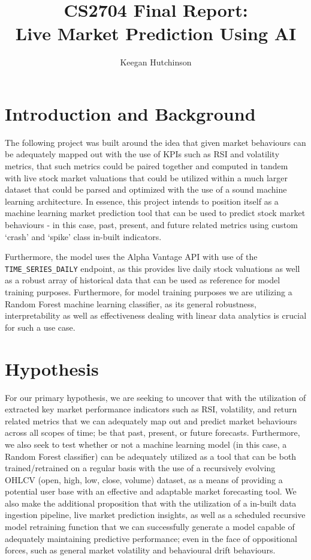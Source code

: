 \documentclass[runningheads]{llncs}
\title{CS2704 Final Report:\\Live Market Prediction Using AI}
\author{Keegan Hutchinson}
\institute{Faculty of Computer Science\\
University of New Brunswick Saint John\\
\email{khutchi3@unb.ca}\\
(Solo Submission)}
\begin{document}
\maketitle


\section{Introduction and Background}
The following project was built around the idea that given market behaviours can be adequately mapped out with the use of KPIs such as RSI and volatility metrics, that such metrics could be paired together and computed in tandem with live stock market valuations that could be utilized within a much larger dataset that could be parsed and optimized with the use of a sound machine learning architecture. In essence, this project intends to position itself as a machine learning market prediction tool that can be used to predict stock market behaviours - in this case, past, present, and future related metrics using custom ‘crash’ and ‘spike’ class in-built indicators.

Furthermore, the model uses the Alpha Vantage API with use of the \texttt{TIME\_SERIES\_DAILY} endpoint, as this provides live daily stock valuations as well as a robust array of historical data that can be used as reference for model training purposes. Furthermore, for model training purposes we are utilizing a Random Forest machine learning classifier, as its general robustness, interpretability as well as effectiveness dealing with linear data analytics is crucial for such a use case.

\section{Hypothesis}
For our primary hypothesis, we are seeking to uncover that with the utilization of extracted key market performance indicators such as RSI, volatility, and return related metrics that we can adequately map out and predict market behaviours across all scopes of time; be that past, present, or future forecasts. Furthermore, we also seek to test whether or not a machine learning model  (in this case, a Random Forest classifier) can be adequately utilized as a tool that can be both trained/retrained on a regular basis with the use of a recursively evolving OHLCV (open, high, low, close, volume) dataset, as a means of providing a potential user base with an effective and adaptable market forecasting tool. We also make the additional proposition that with the utilization of a in-built data ingestion pipeline,  live market prediction insights, as well as a scheduled recursive model retraining function that we can successfully generate a model capable of adequately maintaining predictive performance; even in the face of oppositional forces, such as general market volatility and behavioural drift behaviours.
\end{document}
